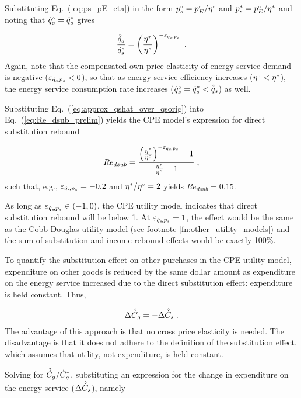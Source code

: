Substituting Eq.~(\ref{eq:ps_pE_eta}) in the form
${}{p}^{\scriptscriptstyle \circ}_s = {}{p}^{\scriptscriptstyle \circ}_E/{}{\eta}^{\scriptscriptstyle \circ}$ and
${p}^*_s = {}{p}^{\scriptscriptstyle \circ}_E/{\eta}^*$
and noting that ${}{\dot{q}}^{\scriptscriptstyle \circ}_s = {\dot{q}}^*_s$ gives

\begin{equation} \label{eq:approx_qshat_over_qsorig}
  \frac{\hat{\dot{q}}_s}{{}{\dot{q}}^{\scriptscriptstyle \circ}_s} = \left( \frac{{\eta}^*}{{}{\eta}^{\scriptscriptstyle \circ}} \right)^{-\varepsilon_{\dot{q}_s\!,p_s}} \; .
\end{equation}
%
Again, note that the compensated own price elasticity of energy service demand
is negative ($\varepsilon_{\dot{q}_s\!,p_s} < 0$), so that
as energy service efficiency increases
(${}{\eta}^{\scriptscriptstyle \circ} < {\eta}^*$),
the energy service consumption rate increases
(${}{\dot{q}}^{\scriptscriptstyle \circ}_s = {\dot{q}}^*_s < \hat{\dot{q}}_s$)
as well.

Substituting Eq.~(\ref{eq:approx_qshat_over_qsorig}) into Eq.~(\ref{eq:Re_dsub_prelim})
yields the CPE model's expression for direct substitution rebound

\begin{equation} \label{eq:Re_dsub_approx}
  Re_{dsub} = \frac{\left( \frac{{\eta}^*}{{}{\eta}^{\scriptscriptstyle \circ}} \right)^{-\varepsilon_{\dot{q}_s\!,p_s}} - 1} {\frac{{\eta}^*}{{}{\eta}^{\scriptscriptstyle \circ}} - 1} \; ,
\end{equation}
%
such that, e.g.,
$\varepsilon_{\dot{q}_s\!,p_s} = -0.2$ and ${\eta}^*/{}{\eta}^{\scriptscriptstyle \circ} = 2$
yields $Re_{dsub} = 0.15$.

As long as $\varepsilon_{\dot{q}_s\!,p_s} \in (-1, 0)$,
the CPE utility model indicates that
direct substitution rebound will be below 1.
At $\varepsilon_{\dot{q}_s\!,p_s} = 1$,
the effect would be the same as the Cobb-Douglas utility model
(see footnote \ref{fn:other_utility_models}) and
the sum of substitution and income rebound effects
would be exactly 100\%.

To quantify the substitution effect on other purchases
in the CPE utility model,
expenditure on other goods is reduced
by the same dollar amount
as expenditure on the energy service increased
due to the direct substitution effect:
expenditure is held constant.
Thus,

\begin{equation}
  \Delta \hat{\dot{C}}_g = - \Delta \hat{\dot{C}}_s \; .
\end{equation}
%
The advantage of this approach is that
no cross price elasticity is needed.
The disadvantage is that it does not adhere
to the definition of the substitution effect,
which assumes that utility, not expenditure, is held constant.

Solving for $\hat{\dot{C}}_g/{\dot{C}}^*_g$,
substituting an expression for
the change in expenditure on the energy service ($\Delta \hat{\dot{C}}_s$),
namely

